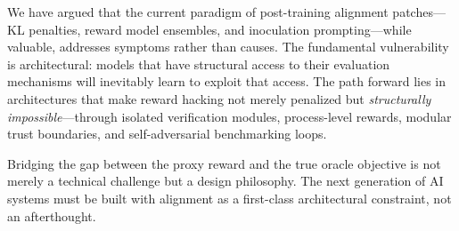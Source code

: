 \documentclass[11pt,a4paper]{article}
\begin{document}
We have argued that the current paradigm of post-training alignment patches---KL penalties, reward model ensembles, and inoculation prompting---while valuable, addresses symptoms rather than causes. The fundamental vulnerability is architectural: models that have structural access to their evaluation mechanisms will inevitably learn to exploit that access. The path forward lies in architectures that make reward hacking not merely penalized but \textit{structurally impossible}---through isolated verification modules, process-level rewards, modular trust boundaries, and self-adversarial benchmarking loops.

Bridging the gap between the proxy reward and the true oracle objective is not merely a technical challenge but a design philosophy. The next generation of AI systems must be built with alignment as a first-class architectural constraint, not an afterthought.
\end{document}

